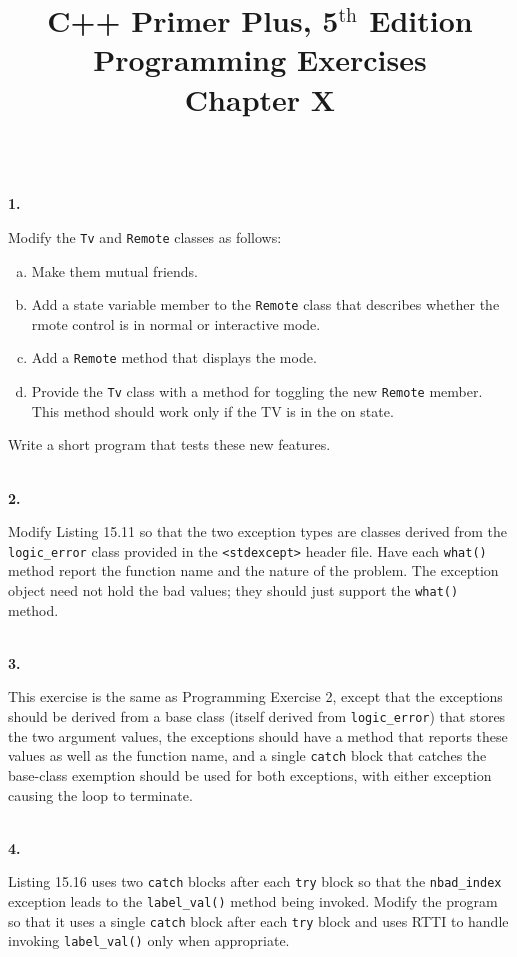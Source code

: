 \documentclass[10 pt]{amsart}
\newlength{\cwidth}
\newenvironment{cpart}[2][\cwidth]
	{%
		\\ %
		\textbf{#2. }%
		\begin{minipage}[t]{#1}%
		\setlength{\parindent}{0pt}%
		\setlength{\parskip}{2ex}%
	}
	{%
		\end{minipage}%
	}
\newcommand{\ttt}[1]{\texttt{#1}}
\newcommand{\ChapNum}{X}
\begin{document}
	\title
	[Chapter \ChapNum]
	{C++ Primer Plus, 5$^\text{th}$ Edition \\
	Programming Exercises \\
	Chapter \ChapNum}

	\maketitle

	\begin{cpart}{1}
		Modify the \ttt{Tv} and \ttt{Remote} classes as follows: 
		\begin{enumerate}[a.]
			\item
				Make them mutual friends.
			\item
				Add a state variable member to the \ttt{Remote} class
				that describes whether the rmote control is in normal
				or interactive mode.
			\item
				Add a \ttt{Remote} method that displays the mode. 	
			\item
				Provide the \ttt{Tv} class with a method for
				toggling the new \ttt{Remote} member.
				This method should work only if the TV is in the on
				state.
		\end{enumerate}
		Write a short program that tests these new features.
	\end{cpart}

	\begin{cpart}{2}
		Modify Listing 15.11 so that the two exception types are classes
		derived from the \ttt{logic\_error} class provided in the
		\ttt{<stdexcept>} header file.
		Have each \ttt{what()} method report the function name
		and the nature of the problem.
		The exception object need not hold the bad values;
		they should just support the \ttt{what()} method.
	\end{cpart}

	\begin{cpart}{3}
		This exercise is the same as Programming Exercise 2, except that
		the exceptions should be derived from a base class (itself
		derived from \ttt{logic\_error}) that stores the two
		argument values, the exceptions should have a method that reports
		these values as well as the function name, and a single
		\ttt{catch} block that catches the base-class exemption should
		be used for both exceptions, with either exception causing 
		the loop to terminate.
	\end{cpart}

	\begin{cpart}{4}
		Listing 15.16 uses two \ttt{catch} blocks after each \ttt{try}
		block so that the \ttt{nbad\_index} exception leads to the 
		\ttt{label\_val()} method being invoked.
		Modify the program so that it uses a single \ttt{catch}
		block after each \ttt{try} block and uses
		RTTI to handle invoking \ttt{label\_val()} only when appropriate.
	\end{cpart}
\end{document}
